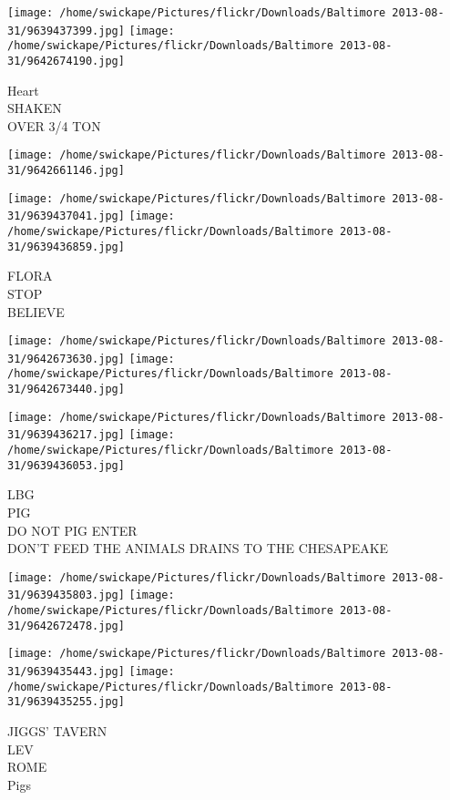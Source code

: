 \documentclass[10pt,letterpaper]{article}
\begin{document}
\vspace{0.25in}
\texttt{[image: /home/swickape/Pictures/flickr/Downloads/Baltimore 2013-08-31/9639437399.jpg]}
\texttt{[image: /home/swickape/Pictures/flickr/Downloads/Baltimore 2013-08-31/9642674190.jpg]}

Heart\\
SHAKEN\\
OVER 3/4 TON
\pagebreak

\texttt{[image: /home/swickape/Pictures/flickr/Downloads/Baltimore 2013-08-31/9642661146.jpg]}

\vspace{0.25in}
\texttt{[image: /home/swickape/Pictures/flickr/Downloads/Baltimore 2013-08-31/9639437041.jpg]}
\texttt{[image: /home/swickape/Pictures/flickr/Downloads/Baltimore 2013-08-31/9639436859.jpg]}

FLORA\\
STOP\\
BELIEVE
\pagebreak

\texttt{[image: /home/swickape/Pictures/flickr/Downloads/Baltimore 2013-08-31/9642673630.jpg]}
\texttt{[image: /home/swickape/Pictures/flickr/Downloads/Baltimore 2013-08-31/9642673440.jpg]}

\texttt{[image: /home/swickape/Pictures/flickr/Downloads/Baltimore 2013-08-31/9639436217.jpg]}
\texttt{[image: /home/swickape/Pictures/flickr/Downloads/Baltimore 2013-08-31/9639436053.jpg]}

LBG\\
PIG\\
DO NOT PIG ENTER\\
DON'T FEED THE ANIMALS DRAINS TO THE CHESAPEAKE
\pagebreak

\texttt{[image: /home/swickape/Pictures/flickr/Downloads/Baltimore 2013-08-31/9639435803.jpg]}
\texttt{[image: /home/swickape/Pictures/flickr/Downloads/Baltimore 2013-08-31/9642672478.jpg]}

\texttt{[image: /home/swickape/Pictures/flickr/Downloads/Baltimore 2013-08-31/9639435443.jpg]}
\texttt{[image: /home/swickape/Pictures/flickr/Downloads/Baltimore 2013-08-31/9639435255.jpg]}

JIGGS' TAVERN\\
LEV\\
ROME\\
Pigs
\pagebreak
\end{document}
